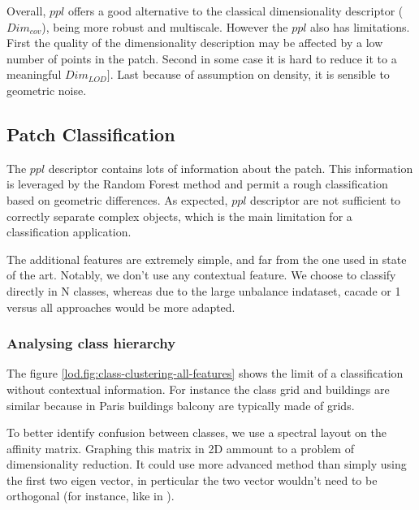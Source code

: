 		Overall, $ppl$ offers a good alternative to the classical dimensionality descriptor ($Dim_{cov}$), being more robust and multiscale. 
		However the $ppl$ also has limitations. 
		First the quality of the dimensionality description may be affected by a low number of points in the patch. 
		Second in some case it is hard to reduce it to a meaningful $Dim_{LOD}]$.
		Last because of assumption on density, it is sensible to geometric noise.
			  
	\subsection{Patch Classification}
		The $ppl$ descriptor contains lots of information about the patch. This information is leveraged by the Random Forest method and permit a rough classification based on geometric differences.
		As expected, $ppl$ descriptor are  not sufficient to correctly separate complex objects,
		which is the main limitation for a classification application. 
		
		The additional features are extremely simple, and far from the one used in state of the art.
		Notably, we don't use any contextual feature.
		We choose to classify directly in N classes, whereas due to the large unbalance indataset, cacade or 1 versus all approaches would be more adapted.
		
	\subsubsection{Analysing class hierarchy} 
		The figure \ref{lod.fig:class-clustering-all-features} shows the limit of a classification without contextual information. For instance the class grid and buildings are similar because in Paris buildings balcony are typically made of grids.
		
		To better identify confusion between classes, we use a spectral layout on the affinity matrix.
		Graphing this matrix in 2D ammount to a problem of dimensionality reduction.
		It could use more advanced method than simply using the first two eigen vector,
		in perticular the two vector wouldn't need to be orthogonal (for instance, like in \cite{Hyvarinen2000}).
				 
